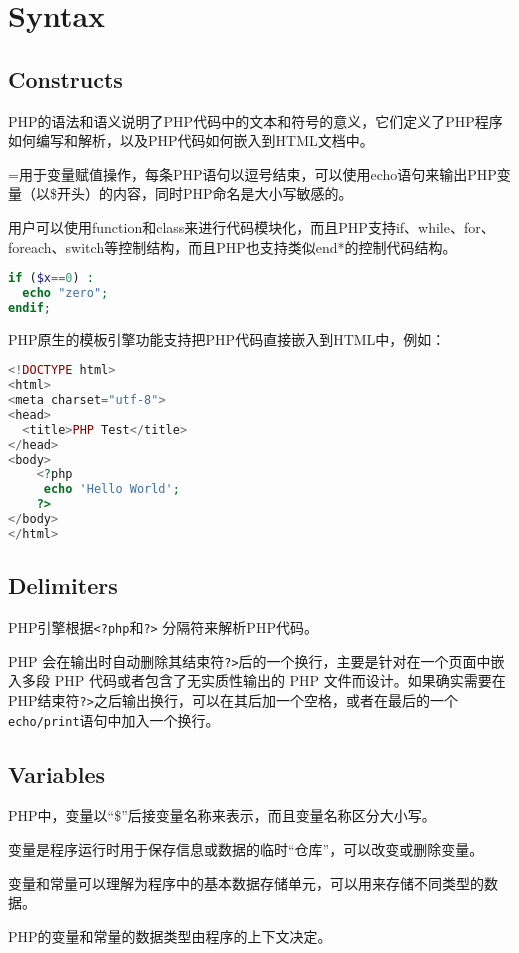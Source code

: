 \chapter{Syntax}


\section{Constructs}


PHP的语法和语义说明了PHP代码中的文本和符号的意义，它们定义了PHP程序如何编写和解析，以及PHP代码如何嵌入到HTML文档中。

=用于变量赋值操作，每条PHP语句以逗号结束，可以使用echo语句来输出PHP变量（以\$开头）的内容，同时PHP命名是大小写敏感的。

用户可以使用function和class来进行代码模块化，而且PHP支持if、while、for、foreach、switch等控制结构，而且PHP也支持类似end*的控制代码结构。

\begin{lstlisting}[language=PHP]
if ($x==0) : 
  echo "zero"; 
endif;
\end{lstlisting}


PHP原生的模板引擎功能支持把PHP代码直接嵌入到HTML中，例如：

\begin{lstlisting}[language=PHP]
<!DOCTYPE html>
<html>
<meta charset="utf-8">
<head>
  <title>PHP Test</title>
</head>
<body>
	<?php
	 echo 'Hello World';
	?>
</body>
</html>
\end{lstlisting}


\section{Delimiters}


PHP引擎根据\texttt{<?php}和\texttt{?>} 分隔符来解析PHP代码。

PHP 会在输出时自动删除其结束符\texttt{?>}后的一个换行，主要是针对在一个页面中嵌入多段 PHP 代码或者包含了无实质性输出的 PHP 文件而设计。如果确实需要在PHP结束符\texttt{?>}之后输出换行，可以在其后加一个空格，或者在最后的一个\texttt{echo/print}语句中加入一个换行。

\section{Variables}


PHP中，变量以“\$”后接变量名称来表示，而且变量名称区分大小写。

\begin{compactitem}
\item 变量是程序运行时用于保存信息或数据的临时“仓库”，可以改变或删除变量。
\item 变量和常量可以理解为程序中的基本数据存储单元，可以用来存储不同类型的数据。
\item PHP的变量和常量的数据类型由程序的上下文决定。
\end{compactitem}




